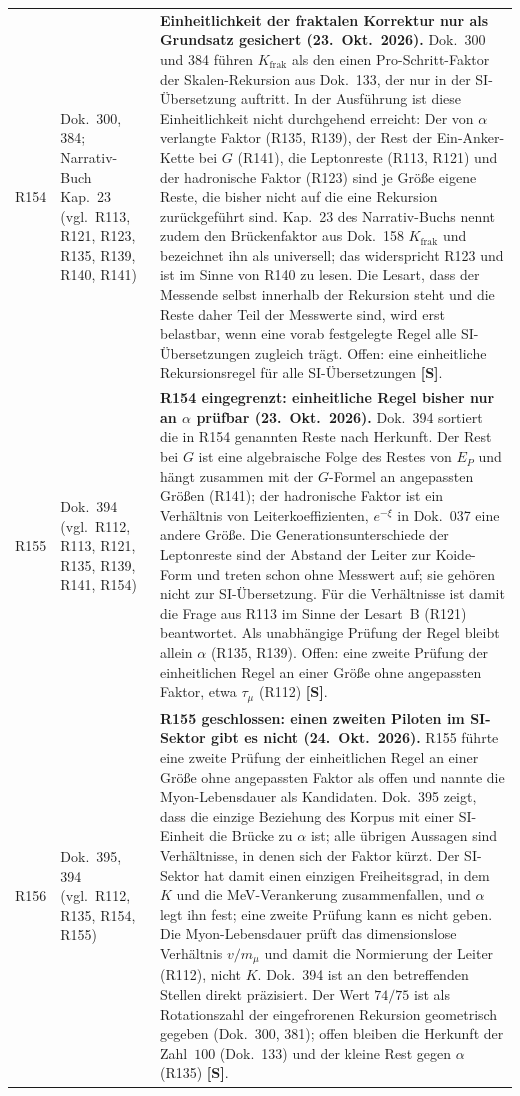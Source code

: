 \begin{longtable}{@{}p{0.9cm}p{3.1cm}p{10.2cm}@{}}
R154 & Dok.~300, 384; Narrativ-Buch Kap.~23 (vgl.\ R113, R121, R123, R135, R139, R140, R141) & \textbf{Einheitlichkeit der fraktalen Korrektur nur als Grundsatz gesichert (23.~Okt.~2026).} Dok.~300 und 384 führen $K_{\mathrm{frak}}$ als den einen Pro-Schritt-Faktor der Skalen-Rekursion aus Dok.~133, der nur in der SI-Übersetzung auftritt. In der Ausführung ist diese Einheitlichkeit nicht durchgehend erreicht: Der von $\alpha$ verlangte Faktor (R135, R139), der Rest der Ein-Anker-Kette bei $G$ (R141), die Leptonreste (R113, R121) und der hadronische Faktor (R123) sind je Größe eigene Reste, die bisher nicht auf die eine Rekursion zurückgeführt sind. Kap.~23 des Narrativ-Buchs nennt zudem den Brückenfaktor aus Dok.~158 $K_{\mathrm{frak}}$ und bezeichnet ihn als universell; das widerspricht R123 und ist im Sinne von R140 zu lesen. Die Lesart, dass der Messende selbst innerhalb der Rekursion steht und die Reste daher Teil der Messwerte sind, wird erst belastbar, wenn eine vorab festgelegte Regel alle SI-Übersetzungen zugleich trägt. Offen: eine einheitliche Rekursionsregel für alle SI-Übersetzungen \textbf{[S]}. \\
R155 & Dok.~394 (vgl.\ R112, R113, R121, R135, R139, R141, R154) & \textbf{R154 eingegrenzt: einheitliche Regel bisher nur an $\alpha$ prüfbar (23.~Okt.~2026).} Dok.~394 sortiert die in R154 genannten Reste nach Herkunft. Der Rest bei $G$ ist eine algebraische Folge des Restes von $E_P$ und hängt zusammen mit der $G$-Formel an angepassten Größen (R141); der hadronische Faktor ist ein Verhältnis von Leiterkoeffizienten, $e^{-\xi}$ in Dok.~037 eine andere Größe. Die Generationsunterschiede der Leptonreste sind der Abstand der Leiter zur Koide-Form und treten schon ohne Messwert auf; sie gehören nicht zur SI-Übersetzung. Für die Verhältnisse ist damit die Frage aus R113 im Sinne der Lesart~B (R121) beantwortet. Als unabhängige Prüfung der Regel bleibt allein $\alpha$ (R135, R139). Offen: eine zweite Prüfung der einheitlichen Regel an einer Größe ohne angepassten Faktor, etwa $\tau_\mu$ (R112) \textbf{[S]}. \\
R156 & Dok.~395, 394 (vgl.\ R112, R135, R154, R155) & \textbf{R155 geschlossen: einen zweiten Piloten im SI-Sektor gibt es nicht (24.~Okt.~2026).} R155 führte eine zweite Prüfung der einheitlichen Regel an einer Größe ohne angepassten Faktor als offen und nannte die Myon-Lebensdauer als Kandidaten. Dok.~395 zeigt, dass die einzige Beziehung des Korpus mit einer SI-Einheit die Brücke zu $\alpha$ ist; alle übrigen Aussagen sind Verhältnisse, in denen sich der Faktor kürzt. Der SI-Sektor hat damit einen einzigen Freiheitsgrad, in dem $K$ und die MeV-Verankerung zusammenfallen, und $\alpha$ legt ihn fest; eine zweite Prüfung kann es nicht geben. Die Myon-Lebensdauer prüft das dimensionslose Verhältnis $v/m_\mu$ und damit die Normierung der Leiter (R112), nicht $K$. Dok.~394 ist an den betreffenden Stellen direkt präzisiert. Der Wert $74/75$ ist als Rotationszahl der eingefrorenen Rekursion geometrisch gegeben (Dok.~300, 381); offen bleiben die Herkunft der Zahl~$100$ (Dok.~133) und der kleine Rest gegen $\alpha$ (R135) \textbf{[S]}. \\

\end{longtable}
